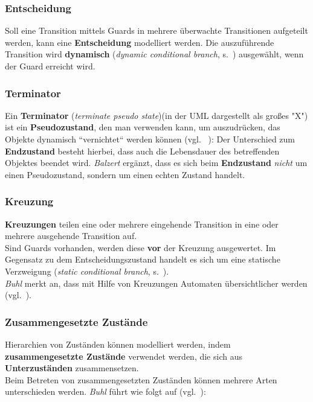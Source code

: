 \subsubsection*{Entscheidung}
Soll eine Transition mittels Guards in mehrere überwachte Transitionen aufgeteilt werden, kann eine \textbf{Entscheidung} modelliert werden.
Die auszuführende Transition wird \textbf{dynamisch} (\textit{dynamic conditional branch}, s.~\cite[339 f.]{Bal05}) ausgewählt, wenn der Guard erreicht wird.

\subsubsection*{Terminator}
Ein \textbf{Terminator} (\textit{terminate pseudo state})(in der UML dargestellt als großes "X") ist ein \textbf{Pseudozustand}, den man verwenden kann, um auszudrücken, das Objekte dynamisch ``vernichtet`` werden können (vgl. ~\cite[341]{Bal05}): Der Unterschied zum \textbf{Endzustand} besteht hierbei, dass auch die Lebensdauer des betreffenden Objektes beendet wird. \textit{Balzert} ergänzt, dass es sich beim \textbf{Endzustand} \textit{nicht} um einen Pseudozustand, sondern um einen echten Zustand handelt.

\subsubsection*{Kreuzung}
\textbf{Kreuzungen} teilen eine oder mehrere eingehende Transition in eine oder mehrere ausgehende Transition auf.\\
Sind Guards vorhanden, werden diese \textbf{vor} der Kreuzung ausgewertet.
Im Gegensatz zu dem Entscheidungszustand handelt es sich um eine statische Verzweigung (\textit{static conditional branch}, s.~\cite[340]{Bal05}).\\
\textit{Buhl} merkt an, dass mit Hilfe von Kreuzungen Automaten übersichtlicher werden (vgl.~\cite[73]{Buh09}).


\subsubsection*{Zusammengesetzte Zustände}
Hierarchien von Zuständen können modelliert werden, indem \textbf{zusammengesetzte Zustände} verwendet werden, die sich aus \textbf{Unterzuständen} zusammensetzen.\\

\noindent
Beim Betreten von zusammengesetzten Zuständen können mehrere Arten unterschieden werden. \textit{Buhl} führt wie folgt auf (vgl.~\cite[73]{Buh09}):

